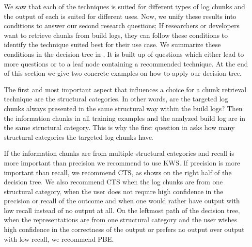 We saw that each of the techniques is suited for different types of
log chunks and the output of each is suited for different uses.
Now, we unify these results into conditions to answer
our second research questions;
If researchers or developers want to retrieve chunks from build logs,
they can follow these conditions to identify the technique
suited best for their use case.
We summarize these conditions in the decision tree in
.
It is built up of questions
which either lead to more questions or to a leaf node containing a
recommended technique.
At the end of this section we give two concrete examples on how to
apply our decision tree.



The first and most important aspect that influences a choice for
a chunk retrieval technique are the structural categories.
In other words,
are the targeted log chunks always presented in
the same structural way within the build logs? Then the information
chunks in all training examples and the analyzed build log are in the
same structural category.
This is why the first question in  asks
how many structural categories the targeted log chunks have.

If the information chunks are from multiple structural categories
and recall is more important than precision we recommend
to use KWS\@.
If precision is more important than recall, we
recommend CTS, as  shows on the
right half of the decision tree.
We also recommend CTS when the log chunks are
from one structural category, when the user does not require high
confidence in the precision or recall of the outcome and when one
would rather have output with low recall instead of no output at all.
On the leftmost path of the decision tree,
when the representations are from one structural category and the user
wishes high confidence in the correctness of the output or prefers
no output over output with low recall, we recommend PBE\@.

